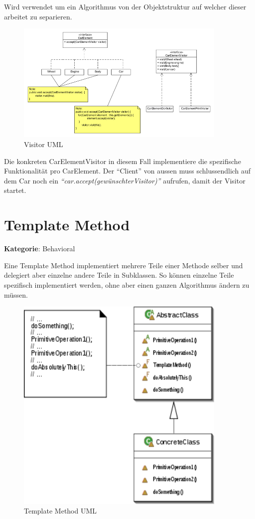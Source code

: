 Wird verwendet um ein Algorithmus von der Objektstruktur auf welcher dieser arbeitet zu separieren.

\begin{figure}[H]
	\centering
	\includegraphics[width=0.9\textwidth]{content/gof/images/17-visitor-uml.png}
	\caption{Visitor UML}
\end{figure}


Die konkreten CarElementVisitor in diesem Fall implementiere die spezifische Funktionalität pro CarElement.
Der ``Client'' von aussen muss schlussendlich auf dem Car noch ein \textit{``car.accept(gewünschterVisitor)''} aufrufen, damit der Visitor startet.


\section{Template Method}
\textbf{Kategorie}: Behavioral

Eine Template Method implementiert mehrere Teile einer Methode selber und delegiert aber einzelne andere Teile in Subklassen. So können einzelne Teile spezifisch implementiert werden, ohne aber einen ganzen Algorithmus ändern zu müssen.

\begin{figure}[H]
	\centering
	\includegraphics[width=0.9\textwidth]{content/gof/images/18-template-method-uml.png}
	\caption{Template Method UML}
\end{figure}


